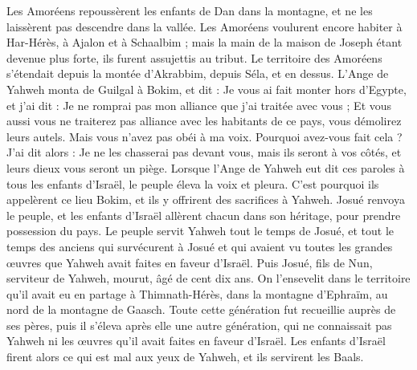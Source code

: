 \begin{multicols}{2}
Les Amoréens repoussèrent les enfants de Dan dans la montagne, et ne les laissèrent pas descendre dans la vallée.
Les Amoréens voulurent encore habiter à Har-Hérès, à Ajalon et à Schaalbim ; mais la main de la maison de Joseph étant devenue plus forte, ils furent assujettis au tribut.
Le territoire des Amoréens s'étendait depuis la montée d’Akrabbim, depuis Séla, et en dessus.
\VerseOne{}L'Ange de Yahweh monta de Guilgal à Bokim, et dit : Je vous ai fait monter hors d'Egypte, et j'ai dit : Je ne romprai pas mon alliance que j'ai traitée avec vous ;
Et vous aussi vous ne traiterez pas alliance avec les habitants de ce pays, vous démolirez leurs autels. Mais vous n'avez pas obéi à ma voix.  Pourquoi avez-vous fait cela ?
J’ai dit alors : Je ne les chasserai pas devant vous, mais ils seront à vos côtés, et leurs dieux vous seront un piège.
Lorsque l'Ange de Yahweh eut dit ces paroles à tous les enfants d'Israël, le peuple éleva la voix et pleura.
C'est pourquoi ils appelèrent ce lieu Bokim, et ils  y offrirent des sacrifices à Yahweh.
Josué renvoya le peuple, et les enfants d'Israël allèrent chacun dans son héritage, pour prendre possession du pays.
Le peuple servit Yahweh tout le temps de Josué, et tout le temps des anciens qui survécurent à Josué et qui avaient vu toutes les grandes œuvres que Yahweh avait faites en faveur d’Israël.
Puis Josué, fils de Nun, serviteur de Yahweh, mourut, âgé de cent dix ans.
On l’ensevelit dans le territoire qu’il avait eu en partage à Thimnath-Hérès, dans la montagne d'Ephraïm, au nord de la montagne de Gaasch.
Toute cette génération fut recueillie auprès de ses pères, puis il s’éleva après elle une autre génération, qui ne connaissait pas Yahweh ni les œuvres qu'il avait faites en faveur d’Israël.
Les enfants d'Israël firent alors ce qui est mal aux yeux de Yahweh, et ils servirent les Baals.

\end{multicols}

